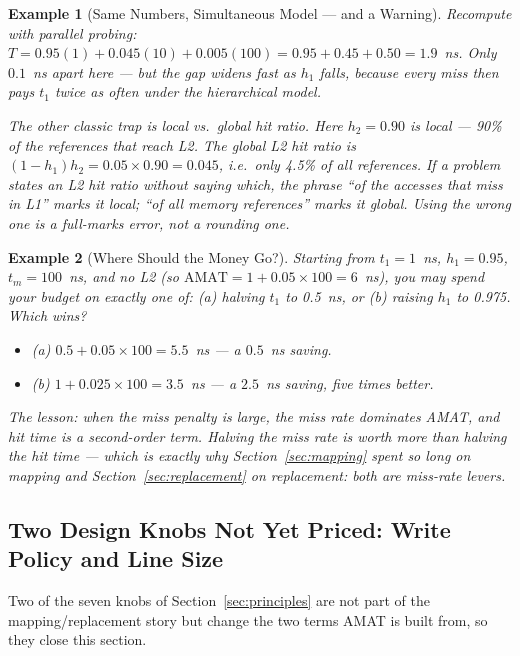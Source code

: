\documentclass[11pt]{article}
\newtheorem{example}{Example}[section]
\begin{document}
\begin{example}[Same Numbers, Simultaneous Model --- and a Warning]
\label{ex:multi-simul}
Recompute with parallel probing: $T = 0.95(1) + 0.045(10) + 0.005(100) = 0.95 + 0.45 + 0.50 = 1.9$~ns. Only $0.1$~ns apart here --- but the gap widens fast as $h_1$ falls, because every miss then pays $t_1$ twice as often under the hierarchical model.

The other classic trap is \emph{local vs.\ global} hit ratio. Here $h_2 = 0.90$ is \emph{local} --- 90\% of the references that \emph{reach} L2. The \emph{global} L2 hit ratio is $(1-h_1)h_2 = 0.05 \times 0.90 = 0.045$, i.e.\ only 4.5\% of all references. If a problem states an L2 hit ratio without saying which, the phrase ``of the accesses that miss in L1'' marks it local; ``of all memory references'' marks it global. Using the wrong one is a full-marks error, not a rounding one.
\end{example}

\begin{example}[Where Should the Money Go?]
\label{ex:money}
Starting from $t_1 = 1$~ns, $h_1 = 0.95$, $t_m = 100$~ns, and no L2 (so $\text{AMAT} = 1 + 0.05 \times 100 = 6$~ns), you may spend your budget on exactly one of: (a) halving $t_1$ to 0.5~ns, or (b) raising $h_1$ to 0.975. Which wins?

\begin{itemize}
  \item (a) $0.5 + 0.05 \times 100 = 5.5$~ns --- a $0.5$~ns saving.
  \item (b) $1 + 0.025 \times 100 = 3.5$~ns --- a $2.5$~ns saving, \emph{five times better}.
\end{itemize}

The lesson: when the miss penalty is large, the miss \emph{rate} dominates AMAT, and hit time is a second-order term. Halving the miss rate is worth more than halving the hit time --- which is exactly why Section~\ref{sec:mapping} spent so long on mapping and Section~\ref{sec:replacement} on replacement: both are miss-rate levers.
\end{example}

\subsection{Two Design Knobs Not Yet Priced: Write Policy and Line Size}
\label{sec:write-policy}

Two of the seven knobs of Section~\ref{sec:principles} are not part of the mapping/replacement story but change the two terms AMAT is built from, so they close this section.
\end{document}

